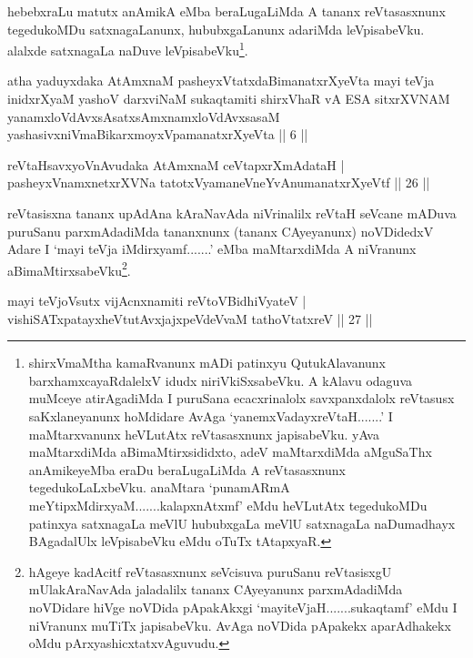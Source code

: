 \begin{artha}
hebebxraLu matutx anAmikA eMba beraLugaLiMda A tananx reVtasasxnunx 
tegedukoMDu satxnagaLanunx, hububxgaLanunx adariMda leVpisabeVku. 
alalxde satxnagaLa naDuve leVpisabeVku\footnote[1]{shirxVmaMtha 
kamaRvanunx mADi patinxyu QutukAlavanunx barxhamxcayaRdalelxV idudx 
niriVkiSxsabeVku. A kAlavu odaguva muMceye atirAgadiMda I puruSana 
ecacxrinalolx savxpanxdalolx reVtasusx saKxlaneyanunx hoMdidare AvAga 
`yanemxVadayxreVtaH.......' I maMtarxvanunx heVLutAtx reVtasasxnunx 
japisabeVku. yAva maMtarxdiMda aBimaMtirxsididxto, adeV maMtarxdiMda 
aMguSaThx anAmikeyeMba eraDu beraLugaLiMda A reVtasasxnunx 
tegedukoLaLxbeVku. anaMtara `punamARmA meYtipxMdirxyaM.......kalapxnAtxmf' eMdu heVLutAtx tegedukoMDu 
patinxya satxnagaLa meVlU hububxgaLa meVlU satxnagaLa naDumadhayx 
BAgadalUlx leVpisabeVku eMdu oTuTx tAtapxyaR.}.
\end{artha}

\begin{shl}
atha yaduyxdaka AtAmxnaM pasheyxVtatxdaBimanatxrXyeVta mayi teVja inidxrXyaM yashoV darxviNaM sukaqtamiti shirxVhaR vA ESA sitxrXVNAM yanamxloVdAvxsAsatxsAmxnamxloVdAvxsasaM yashasivxniVmaBikarxmoyxVpamanatxrXyeVta || 6 ||
\end{shl}

\begin{shl}
reVtaHsavxyoVnAvudaka AtAmxnaM ceVtapxrXmAdataH | \\
pasheyxVnamxnetxrXVNa tatotxVyamaneVneYvAnumanatxrXyeVtf \hfill|| 26 || 
\end{shl}

\begin{artha}
reVtasisxna tananx upAdAna kAraNavAda niVrinalilx reVtaH seVcane 
mADuva puruSanu parxmAdadiMda tananxnunx (tananx CAyeyanunx) noVDidedxV 
Adare I `mayi teVja iMdirxyamf.......' eMba maMtarxdiMda A niVranunx 
aBimaMtirxsabeVku\footnote[2]{hAgeye kadAcitf reVtasasxnunx seVcisuva 
puruSanu reVtasisxgU mUlakAraNavAda jaladalilx tananx CAyeyanunx 
parxmAdadiMda noVDidare hiVge noVDida pApakAkxgi `mayiteVjaH.......sukaqtamf' eMdu I 
niVranunx muTiTx japisabeVku. AvAga noVDida pApakekx aparAdhakekx oMdu 
pArxyashicxtatxvAguvudu.}.
\end{artha}


\begin{shl}
mayi teVjoV\s sutx vijAcnxnamiti reVtoV\s BidhiVyateV | \\
vishiSATxpatayxheVtutAvxjajxpeVdeVvaM tathoVtatxreV \hfill|| 27 || 
\end{shl}

